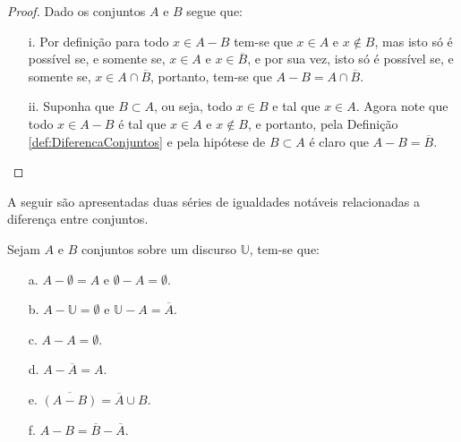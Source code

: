\begin{proof}
	Dado os conjuntos $A$ e $B$ segue que:
	\begin{itemize}
		\item[i.] Por definição para todo $x \in A - B$ tem-se que $x \in A$ e $x \notin B$, mas isto só é possível se, e somente se, $x \in A$ e $x \in \overline{B}$, e por sua vez, isto só é possível se, e somente se, $x \in A \cap \overline{B}$, portanto, tem-se que $A - B = A \cap \overline{B}$.
		\item[ii.] Suponha que $B \subset A$, ou seja, todo $x \in B$ e tal que $x \in A$. Agora note que todo $x \in A - B$ é tal que $x \in A$ e $x \notin B$, e portanto, pela Definição \ref{def:DiferencaConjuntos} e pela hipótese de $B \subset A$ é claro que $A - B = \overline{B}$.
	\end{itemize}
\end{proof}

A seguir são apresentadas duas séries de igualdades notáveis relacionadas a diferença entre conjuntos.

\begin{teorema}\label{teo:ElementarDiferencaConjuntos1}
	Sejam $A$ e $B$ conjuntos sobre um discurso $\mathbb{U}$, tem-se que:
	\begin{itemize}
		\item[a.] $A - \emptyset = A$ e $\emptyset - A = \emptyset$.
		\item[b.] $A - \mathbb{U} = \emptyset$ e $\mathbb{U} - A = \overline{A}$.
		\item[c.] $A - A = \emptyset$.
		\item[d.] $A - \overline{A} = A$.
		\item[e.] $\overline{(A - B)} = \overline{A} \cup B$.
		\item[f.] $A - B = \overline{B} - \overline{A}$.
	\end{itemize}
\end{teorema}

